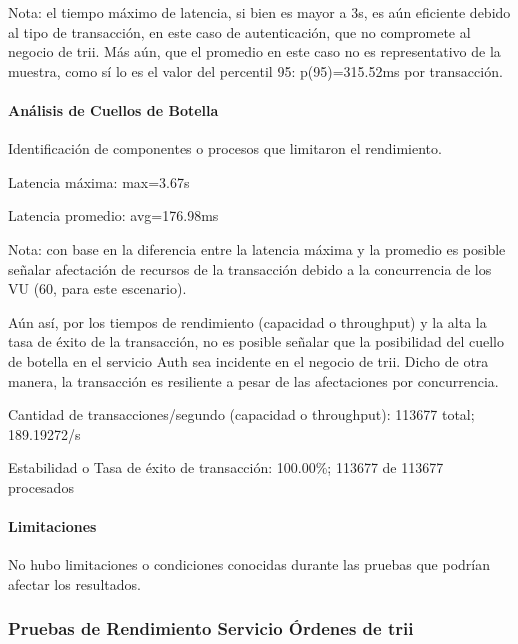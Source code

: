 \documentclass[
  paper=a4,
  ,captions=tableheading
]{scrartcl}
\renewenvironment{quote}{\begin{customblockquote}\list{}{\rightmargin=0em\leftmargin=0em}%
\item\relax\color{blockquote-text}\ignorespaces}{\unskip\unskip\endlist\end{customblockquote}}
\begin{document}
Nota: el tiempo máximo de latencia, si bien es mayor a 3s, es aún
eficiente debido al tipo de transacción, en este caso de autenticación,
que no compromete al negocio de trii. Más aún, que el promedio en este
caso no es representativo de la muestra, como sí lo es el valor del
percentil 95: p(95)=315.52ms por transacción.

\paragraph{Análisis de Cuellos de
Botella}\label{sec:anuxe1lisis-de-cuellos-de-botella-1}

Identificación de componentes o procesos que limitaron el rendimiento.

\begin{quote}
Latencia máxima: max=3.67s

Latencia promedio: avg=176.98ms
\end{quote}

Nota: con base en la diferencia entre la latencia máxima y la promedio
es posible señalar afectación de recursos de la transacción debido a la
concurrencia de los VU (60, para este escenario).

Aún así, por los tiempos de rendimiento (capacidad o throughput) y la
alta la tasa de éxito de la transacción, no es posible señalar que la
posibilidad del cuello de botella en el servicio Auth sea incidente en
el negocio de trii. Dicho de otra manera, la transacción es resiliente a
pesar de las afectaciones por concurrencia.

\begin{quote}
Cantidad de transacciones/segundo (capacidad o throughput): 113677
total; 189.19272/s

Estabilidad o Tasa de éxito de transacción: 100.00\%; 113677 de 113677
procesados
\end{quote}

\paragraph{Limitaciones}\label{sec:limitaciones-1}

\begin{quote}
No hubo limitaciones o condiciones conocidas durante las pruebas que
podrían afectar los resultados.
\end{quote}

\subsubsection{Pruebas de Rendimiento Servicio Órdenes de
trii}\label{sec:pruebas-de-rendimiento-servicio-uxf3rdenes-de-trii}
\end{document}
